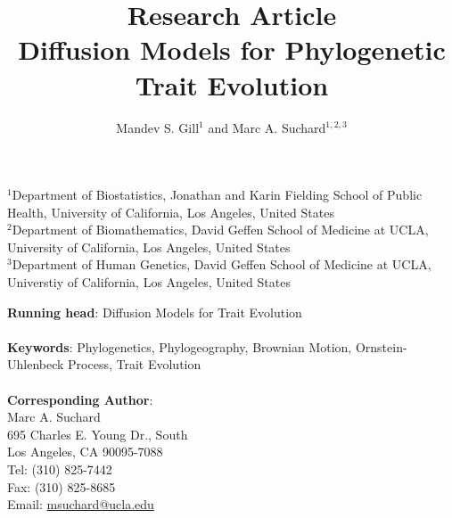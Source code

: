 \documentclass[12pt]{article}
\begin{document}



\title{\vspace{-2cm}
{\LARGE \bf Research Article} \\
  Diffusion Models for Phylogenetic Trait Evolution}

\vspace{0.2cm}

\author{Mandev S. Gill$^1$ and Marc A. Suchard$^{1,2,3}$}

\date{}

\maketitle

\begin{center}
  $^1$Department of Biostatistics, Jonathan and Karin Fielding School of Public Health, University
  of California, Los Angeles, United States\\
  $^2$Department of Biomathematics, David Geffen School of Medicine at UCLA, University of California, 
  Los Angeles, United States \\
  $^3$Department of Human Genetics, David Geffen School of Medicine at UCLA, Universtiy of California, 
  Los Angeles, United States \\
\end{center}

\begin{center}
  \setlength{\baselineskip}{0.7cm}
  {\bf Running head}: Diffusion Models for Trait Evolution \\ \ \\
  {\bf Keywords}: Phylogenetics, Phylogeography, Brownian Motion, Ornstein-Uhlenbeck Process, Trait Evolution \\ \ \\
  {\bf Corresponding Author}: \\ 
  Marc A. Suchard \\
  695 Charles E. Young Dr., South \\
  Los Angeles, CA 90095-7088 \\
  Tel: (310) 825-7442 \\
  Fax:  (310) 825-8685 \\
  Email: \url{msuchard@ucla.edu}
\end{center}

\clearpage
\end{document}
